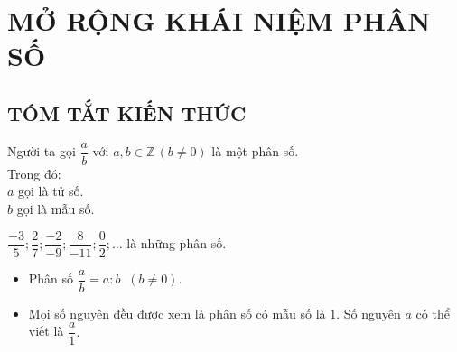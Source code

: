 \section{MỞ RỘNG KHÁI NIỆM PHÂN SỐ}
\subsection{TÓM TẮT KIẾN THỨC}
\begin{tomtat}
Người ta gọi $\dfrac{a}{b}$ với $a,b \in \mathbb{Z} \,(b\neq 0)$ là một phân số.\\
Trong đó: \\
 $a$ gọi là tử số.\\
 $b$ gọi là mẫu số.\\
\begin{vd} $\dfrac{-3}{5}; \dfrac{2}{7}; \dfrac{-2}{-9}; \dfrac{8}{-11}; \dfrac{0}{2};\ldots $ là những phân số.
\end{vd}
\begin{note}
\begin{itemize}
\item Phân số $\dfrac{a}{b} =a:b \;\; (b\neq 0)$.
\item Mọi số nguyên đều được xem là phân số có mẫu số là $1$. Số nguyên $a$ có thể viết là $\dfrac{a}{1}.$
\end{itemize}
\end{note}
\end{tomtat}
